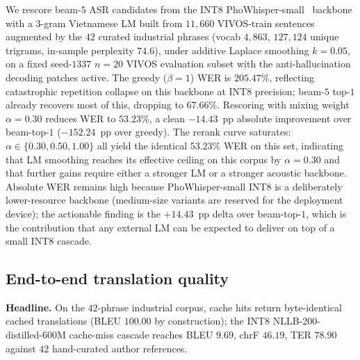 \documentclass[a4paper,fleqn]{cas-dc}
\begin{document}
We rescore beam-$5$ ASR candidates from the INT8 PhoWhisper-small~\citep{le2024phowhisper} backbone with a $3$-gram Vietnamese LM built from $11{,}660$ VIVOS-train sentences augmented by the $42$ curated industrial phrases (vocab $4{,}863$, $127{,}124$ unique trigrams, in-sample perplexity $74.6$), under additive Laplace smoothing $k = 0.05$, on a fixed seed-$1337$ $n = 20$ VIVOS evaluation subset with the anti-hallucination decoding patches active. The greedy ($\beta = 1$) WER is $205.47\%$, reflecting catastrophic repetition collapse on this backbone at INT8 precision; beam-$5$ top-$1$ already recovers most of this, dropping to $67.66\%$. Rescoring with mixing weight $\alpha = 0.30$ reduces WER to $53.23\%$, a clean $-14.43$~pp absolute improvement over beam-top-$1$ ($-152.24$~pp over greedy). The rerank curve saturates: $\alpha \in \{0.30, 0.50, 1.00\}$ all yield the identical $53.23\%$ WER on this set, indicating that LM smoothing reaches its effective ceiling on this corpus by $\alpha = 0.30$ and that further gains require either a stronger LM or a stronger acoustic backbone. Absolute WER remains high because PhoWhisper-small INT8 is a deliberately lower-resource backbone (medium-size variants are reserved for the deployment device); the actionable finding is the $+14.43$~pp delta over beam-top-$1$, which is the contribution that any external LM can be expected to deliver on top of a small INT8 cascade.

\subsection{End-to-end translation quality}\label{sec:exp:e2equality}
\textbf{Headline.} On the $42$-phrase industrial corpus, cache hits return byte-identical cached translations (BLEU $100.00$ by construction); the INT8 NLLB-200-distilled-600M cache-miss cascade reaches BLEU $9.69$, chrF $46.19$, TER $78.90$ against $42$ hand-curated author references.
\end{document}
